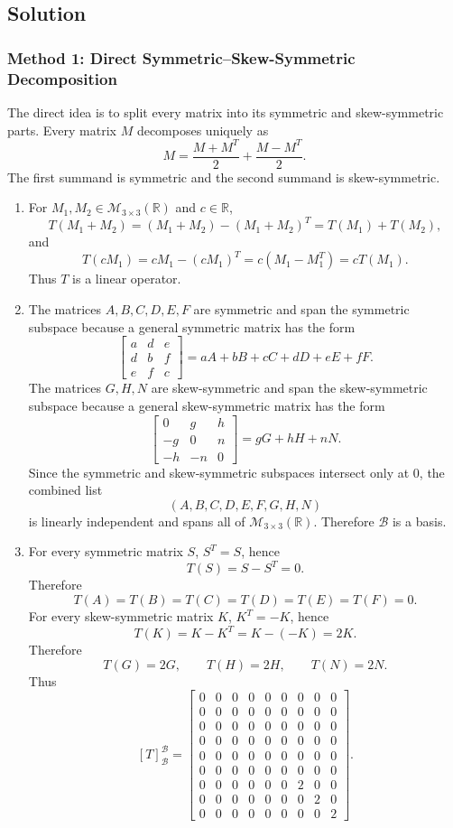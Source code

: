 \documentclass[12pt]{article}
\newcommand{\R}{\mathbb{R}}
\newcommand{\M}{\mathcal{M}}
\newcommand{\B}{\mathcal{B}}
\begin{document}
\newpage
\subsection{Solution}

\subsubsection{Method 1: Direct Symmetric--Skew-Symmetric Decomposition}
The direct idea is to split every matrix into its symmetric and skew-symmetric parts. Every matrix $M$ decomposes uniquely as
\[
M=\frac{M+M^T}{2}+\frac{M-M^T}{2}.
\]
The first summand is symmetric and the second summand is skew-symmetric.

\begin{enumerate}[label=(\alph*)]
  \item For $M_1,M_2\in\M_{3\times3}(\R)$ and $c\in\R$,
  \[
  T(M_1+M_2)=(M_1+M_2)-(M_1+M_2)^T=T(M_1)+T(M_2),
  \]
  and
  \[
  T(cM_1)=cM_1-(cM_1)^T=c(M_1-M_1^T)=cT(M_1).
  \]
  Thus $T$ is a linear operator.

  \item The matrices $A,B,C,D,E,F$ are symmetric and span the symmetric subspace because a general symmetric matrix has the form
  \[
  \begin{bmatrix}
  a&d&e\\ d&b&f\\ e&f&c
  \end{bmatrix}
  =aA+bB+cC+dD+eE+fF.
  \]
  The matrices $G,H,N$ are skew-symmetric and span the skew-symmetric subspace because a general skew-symmetric matrix has the form
  \[
  \begin{bmatrix}
  0&g&h\\ -g&0&n\\ -h&-n&0
  \end{bmatrix}
  =gG+hH+nN.
  \]
  Since the symmetric and skew-symmetric subspaces intersect only at $0$, the combined list
  \[
  (A,B,C,D,E,F,G,H,N)
  \]
  is linearly independent and spans all of $\M_{3\times3}(\R)$. Therefore $\B$ is a basis.

  \item For every symmetric matrix $S$, $S^T=S$, hence
  \[
  T(S)=S-S^T=0.
  \]
  Therefore
  \[
  T(A)=T(B)=T(C)=T(D)=T(E)=T(F)=0.
  \]
  For every skew-symmetric matrix $K$, $K^T=-K$, hence
  \[
  T(K)=K-K^T=K-(-K)=2K.
  \]
  Therefore
  \[
  T(G)=2G,
  \qquad T(H)=2H,
  \qquad T(N)=2N.
  \]
  Thus
  \[
  \boxed{
  [T]_{\B}^{\B}=\begin{bmatrix}
  0&0&0&0&0&0&0&0&0\\
  0&0&0&0&0&0&0&0&0\\
  0&0&0&0&0&0&0&0&0\\
  0&0&0&0&0&0&0&0&0\\
  0&0&0&0&0&0&0&0&0\\
  0&0&0&0&0&0&0&0&0\\
  0&0&0&0&0&0&2&0&0\\
  0&0&0&0&0&0&0&2&0\\
  0&0&0&0&0&0&0&0&2
  \end{bmatrix}.}
  \]


\end{enumerate}
\end{document}
